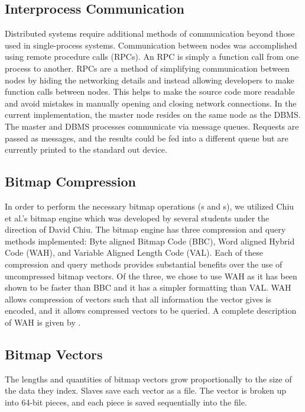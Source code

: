 \subsection{Interprocess Communication}
Distributed systems require additional methods of communication beyond those
used in single-process systems. Communication between nodes was accomplished
using remote procedure calls (RPCs). \cite{rpcgen} An RPC is simply a function
call from one process to another. \cite{tanenbaum1994} RPCs are a method of
simplifying communication between nodes by hiding the networking details and
instead allowing developers to make function calls between nodes. This helps to
make the source code more readable and avoid mistakes in manually opening and
closing network connections. In the current implementation, the master node
resides on the same node as the DBMS. The master and DBMS processes
communicate via message queues. \cite{unixSystemV} Requests are passed as
messages, and the results could be fed into a different queue but are currently
printed to the standard out device.
%
\subsection{Bitmap Compression}
In order to perform the necessary bitmap operations (s and
s), we utilized Chiu et al.'s bitmap engine which was
developed by several students under the direction of David Chiu. The
bitmap engine has three compression and query methods implemented: Byte aligned
Bitmap Code (BBC), Word aligned Hybrid Code (WAH),
and Variable Aligned Length Code (VAL). \cite{guzun2014,wu2001} Each of these
compression and query methods provides substantial benefits over the use of
uncompressed bitmap vectors. Of the three, we chose to use WAH as it has been
shown to be faster than BBC and it has a simpler formatting than VAL. WAH
allows compression of vectors such that all information the vector gives is
encoded, and it allows compressed vectors to be queried. A complete description of WAH
is given by \cite{wu2001}.
%
\subsection{Bitmap Vectors}
The lengths and quantities of bitmap vectors grow proportionally to the size of
the data they index. Slaves save each vector as a file. The vector is broken up
into 64-bit pieces, and each piece is saved sequentially into the file.
%
